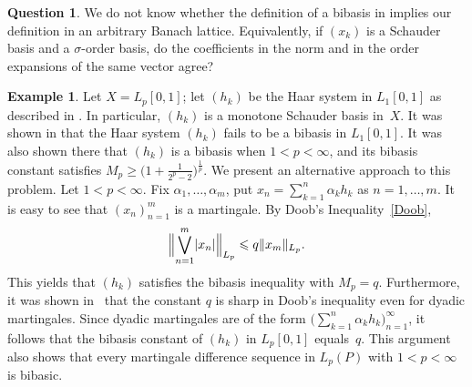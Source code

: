 \documentclass[12pt]{amsart}
\theoremstyle{plain}
\theoremstyle{definition}
\newtheorem{question}[theorem]{Question}
\newtheorem{example}[theorem]{Example}
\newcommand{\abs}[1]{\lvert#1\rvert}
\newcommand{\norm}[1]{\lVert#1\rVert}
\newcommand{\Bignorm}[1]{\Bigl\lVert#1\Bigr\rVert}
\renewcommand{\le}{\leqslant}
\renewcommand{\ge}{\geqslant}
\begin{document}
\begin{question}
  We do not know whether the definition of a bibasis in
  \cite{Gumenchuk:15} implies our definition in an arbitrary Banach
  lattice. Equivalently, if $(x_k)$ is a Schauder basis and a
  $\sigma$-order basis, do the coefficients in the norm and in the
  order expansions of the same vector agree?
\end{question}


\begin{example}\label{Haar}
  Let $X=L_p[0,1]$; let $(h_k)$ be the Haar system in $L_1[0,1]$ as
  described in \cite[p.~3]{Lindenstrauss:77}. In particular, $(h_k)$
  is a monotone Schauder basis in~$X$.  It was shown in
  \cite{Gumenchuk:15} that the Haar system $(h_k)$ fails to be a
  bibasis in $L_1[0,1]$. It was also shown there that $(h_k)$ is a
  bibasis when $1<p<\infty$, and its bibasis constant satisfies
  $M_p\ge\bigl(1+\frac{1}{2^p-2}\bigr)^\frac1p$. We present an
  alternative approach to this problem. Let $1<p<\infty$. Fix
  $\alpha_1,\dots,\alpha_m$, put $x_n=\sum_{k=1}^n\alpha_kh_k$ as
  $n=1,\dots,m$. It is easy to see that $(x_n)_{n=1}^m$ is a
  martingale. By Doob's Inequality~\eqref{Doob},
  \begin{displaymath}
    \Bignorm{\bigvee_{n=1}^m\abs{x_n}}_{L_p}
    \le q\norm{x_m}_{L_p}.
  \end{displaymath}
  This yields that $(h_k)$ satisfies the bibasis inequality with
  $M_p=q$. Furthermore, it was shown in~\cite[p.~15]{Burkholder:91}
  that the constant $q$ is sharp in Doob's inequality even for dyadic
  martingales. Since dyadic martingales are of the form
  $\bigl(\sum_{k=1}^n\alpha_kh_k\bigr)_{n=1}^\infty$, it follows that
  the bibasis constant of $(h_k)$ in $L_p[0,1]$ equals~$q$. This
  argument also shows that every martingale difference sequence in
  $L_p(P)$ with $1<p<\infty$ is bibasic.
\end{example}
\end{document}
